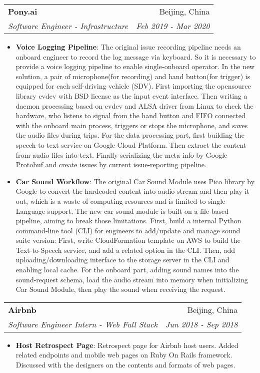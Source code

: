 \documentclass[letterpaper,11pt]{article}
\makeatletter
\newcommand{\resumeItem}[2]{
	\item\small{
		\textbf{#1}{: #2 \vspace{-2pt}}
	}
}
\newcommand{\resumeSubheading}[4]{
	\vspace{-1pt}\item
	\begin{tabular*}{0.97\textwidth}[t]{l@{\extracolsep{\fill}}r}
		\textbf{#1} & #2 \\
		\textit{\small#3} & \textit{\small #4} \\
	\end{tabular*}\vspace{-5pt}
}
\newcommand{\resumeSubSubheading}[2]{
	\begin{tabular*}{0.97\textwidth}{l@{\extracolsep{\fill}}r}
		\textit{\small#1} & \textit{\small #2} \\
	\end{tabular*}\vspace{-5pt}
}
\newcommand{\resumeSubHeadingListEnd}{\end{itemize}}
\newcommand{\resumeItemListStart}{\begin{itemize}}
\newcommand{\resumeItemListEnd}{\end{itemize}\vspace{-5pt}}
\makeatother
\begin{document}
\begin{spacing}{0.87}
	\resumeSubheading
	{Pony.ai}{Beijing, China}
	{Software Engineer - Infrastructure}{Feb 2019 - Mar 2020}
	\resumeItemListStart
	\resumeItem{Voice Logging Pipeline}
	{The original issue recording pipeline needs an onboard engineer to record the log message via keyboard. So it is necessary to provide a voice logging pipeline to enable single-onboard operator. In the new solution, a pair of microphone(for recording) and hand button(for trigger) is equipped for each self-driving vehicle (SDV). First importing the opensource library evdev with BSD license as the input event interface. Then writing a daemon processing based on evdev and ALSA driver from Linux to check the hardware, who listens to signal from the hand button and FIFO connected with the onboard main process, triggers or stops the microphone, and saves the audio files during trips. For the data processing part, first building the speech-to-text service on Google Cloud Platform. Then extract the content from audio files into text. Finally serializing the meta-info by Google Protobuf and create issues by current issue-reporting pipeline.}
	\resumeItem{Car Sound Workflow}
	{The original Car Sound Module uses Pico library by Google to convert the hardcoded content into audio-stream and then play it out, which is a waste of computing resources and is limited to single Language support. The new car sound module is built on a file-based pipeline, aiming to break those limitations. First, build a internal Python command-line tool (CLI) for engineers to add/update and manage sound suite version: First, write CloudFormation template on AWS to build the Text-to-Speech service, and add a related option in the CLI. Then, add uploading/downloading interface to the storage server in the CLI and enabling local cache. For the onboard part, adding sound names into the sound-request schema, load the audio stream into memory when initializing Car Sound Module, then play the sound when receiving the request.}
	\resumeItemListEnd

	
	
	
	\resumeSubheading
	{Airbnb}{Beijing, China}
	{Software Engineer Intern - Web Full Stack}{Jun 2018 - Sep 2018}
	\resumeItemListStart
	\resumeItem{Host Retrospect Page}
	{Retrospect page for Airbnb host users. Added related endpoints and mobile web pages on Ruby On Rails framework. Discussed with the designers on the contents and formats of web pages.}
	\resumeItemListEnd
	

\end{spacing}
\end{document}

